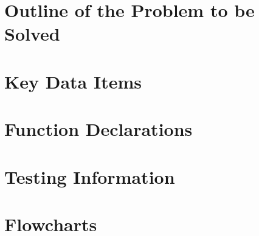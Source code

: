 \documentclass{article}
\begin{document}

\pagebreak

\section{Outline of the Problem to be Solved}


\section{Key Data Items}


\section{Function Declarations}


\section{Testing Information}


\section{Flowcharts}


\pagebreak
\end{document}
